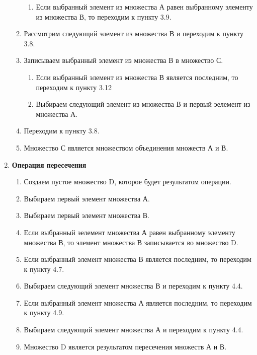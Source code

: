 \documentclass[a4paper,12pt]{extarticle}
\begin{document}
\begin{enumerate}
\begin{enumerate}[label*=\arabic*.]
\begin{enumerate}[label*=\arabic*.]
      \item Если выбранный элемент из множества А равен выбранному элементу из множества В, то переходим к пункту 3.9.
    \end{enumerate}
    \item Рассмотрим следующий элемент из множества В и переходим к пункту 3.8.
    \item Записываем выбранный элемент из множества В в множество С.
    \begin{enumerate}[label*=\arabic*.]
      \item Если выбранный элемент из множества В является последним, то переходим к пункту 3.12
      \item Выбираем следующий элемент из множества В и первый эелемент из множества А.
    \end{enumerate}
    \item Переходим к пункту 3.8.
    \item Множество С является множеством объединения множеств А и В.
  \end{enumerate}
  \item \textbf{Операция пересечения}
  \begin{enumerate}[label*=\arabic*.]
    \item Создаем пустое множество D, которое будет результатом операции.
    \item Выбираем первый элемент множества А.
    \item Выбираем первый элемент множества В.
    \item Если выбранный эелемент множества А равен выбранному элементу множества В, то элемент множества В записывается во множество D.
    \item Если выбранный элемент множества В является последним, то переходим к пункту 4.7.
    \item Выбираем следующий элемент множества В и переходим к пункту 4.4.
    \item Если выбранный элемент множества А является последним, то переходим к пункту 4.9.
    \item Выбираем следующий элемент множества А и переходим к пункту 4.4.
    \item Множество D является результатом пересечения множеств А и В.
  \end{enumerate}
\end{enumerate}
\end{document}
